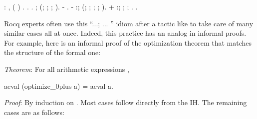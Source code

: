 \documentclass[12pt]{report}
\begin{document}
\begin{coqdoccode}
\coqdocemptyline
\coqdocnoindent
{} : \coqdockw{\ensuremath{\forall}} ,\coqdoceol
\coqdocindent{1.00em}
 ( )   .\coqdoceol
\coqdocnoindent
{}.\coqdoceol
\coqdocindent{1.00em}
 .\coqdoceol
\coqdocindent{1.00em}
 ;\coqdoceol
\coqdocindent{2.00em}
\coqdoceol
\coqdocindent{2.00em}
 (;  ;  ; ).\coqdoceol
\coqdocindent{1.00em}
-  .\coqdoceol
\coqdocindent{1.00em}
- \coqdoceol
\coqdocindent{2.00em}
  :;\coqdoceol
\coqdocindent{3.00em}
\coqdoceol
\coqdocindent{3.00em}
 (;   ;  ;\coqdoceol
\coqdocindent{5.50em}
 ; ).\coqdoceol
\coqdocindent{2.00em}
+    :;\coqdoceol
\coqdocindent{3.00em}
;  ; . .\coqdoceol
\coqdocemptyline
\end{coqdoccode}
Rocq experts often use this ``...; ... '' idiom after a tactic
    like  to take care of many similar cases all at once.
    Indeed, this practice has an analog in informal proofs.  For
    example, here is an informal proof of the optimization theorem
    that matches the structure of the formal one:


    \textit{Theorem}: For all arithmetic expressions ,


       aeval (optimize\_0plus a) = aeval a.


    \textit{Proof}: By induction on .  Most cases follow directly from the
    IH.  The remaining cases are as follows:
\end{document}
